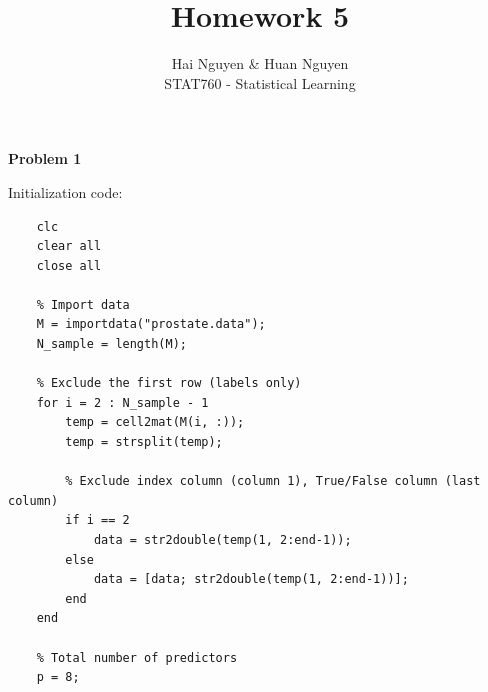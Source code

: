 \documentclass[12pt]{article}
\begin{document}
 
 
 
\title{Homework 5}%
\author{Hai Nguyen \& Huan Nguyen\\ %
STAT760 - Statistical Learning} %
\maketitle
\textbf{Problem 1}

Initialization code:
\begin{lstlisting}
    clc
    clear all
    close all
    
    % Import data
    M = importdata("prostate.data");
    N_sample = length(M);
    
    % Exclude the first row (labels only)
    for i = 2 : N_sample - 1
        temp = cell2mat(M(i, :));
        temp = strsplit(temp);
        
        % Exclude index column (column 1), True/False column (last column)
        if i == 2
            data = str2double(temp(1, 2:end-1));  
        else
            data = [data; str2double(temp(1, 2:end-1))];
        end
    end
    
    % Total number of predictors
    p = 8;
\end{lstlisting}
\end{document}
